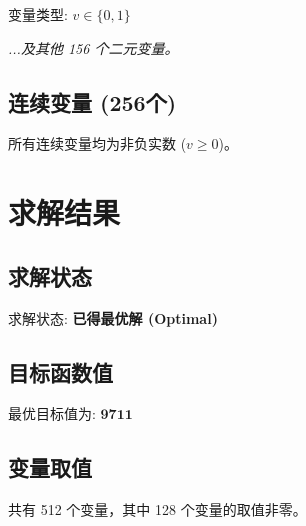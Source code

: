 \documentclass[a4paper,10pt]{article}
\begin{document}
变量类型: $v \in \{0,1\}$

\textit{...及其他 156 个二元变量。}

\subsection{连续变量 (256个)}

所有连续变量均为非负实数 ($v \geq 0$)。

\section{求解结果}

\subsection{求解状态}

求解状态: \textbf{已得最优解 (Optimal)}

\subsection{目标函数值}

最优目标值为: $\mathbf{9711}$

\subsection{变量取值}

共有 512 个变量，其中 128 个变量的取值非零。
\end{document}
